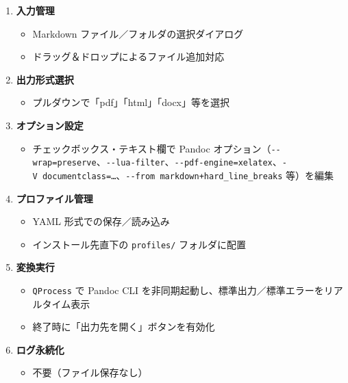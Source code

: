 \begin{enumerate}
\def\labelenumi{\arabic{enumi}.}
\item
  \textbf{入力管理}

  \begin{itemize}
  \tightlist
  \item
    Markdown ファイル／フォルダの選択ダイアログ
  \item
    ドラッグ＆ドロップによるファイル追加対応
  \end{itemize}
\item
  \textbf{出力形式選択}

  \begin{itemize}
  \tightlist
  \item
    プルダウンで「pdf」「html」「docx」等を選択
  \end{itemize}
\item
  \textbf{オプション設定}

  \begin{itemize}
  \tightlist
  \item
    チェックボックス・テキスト欄で Pandoc オプション（\texttt{-\/-wrap=preserve}、\texttt{-\/-lua-filter}、\texttt{-\/-pdf-engine=xelatex}、\texttt{-V\ documentclass=…}、\texttt{-\/-from\ markdown+hard\_line\_breaks} 等）を編集
  \end{itemize}
\item
  \textbf{プロファイル管理}

  \begin{itemize}
  \tightlist
  \item
    YAML 形式での保存／読み込み
  \item
    インストール先直下の \texttt{profiles/} フォルダに配置
  \end{itemize}
\item
  \textbf{変換実行}

  \begin{itemize}
  \tightlist
  \item
    \texttt{QProcess} で Pandoc CLI を非同期起動し、標準出力／標準エラーをリアルタイム表示
  \item
    終了時に「出力先を開く」ボタンを有効化
  \end{itemize}
\item
  \textbf{ログ永続化}

  \begin{itemize}
  \tightlist
  \item
    不要（ファイル保存なし）
  \end{itemize}
\end{enumerate}

